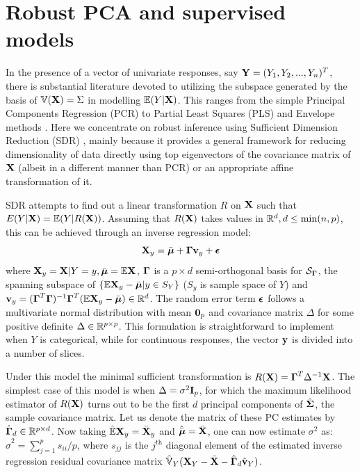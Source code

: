 \section{Robust PCA and supervised models}\label{sec:scatter-sec4-sdr}

In the presence of a vector of univariate responses, say ${\mathbf{Y}} = (Y_1,Y_2,...,Y_n)^T$, there is substantial literature devoted to utilizing the subspace generated by the basis of $ {\mathbb{V}} ({\mathbf{X}}) = \Sigma$ in modelling ${\mathbb{E}}( Y|{\mathbf{X}} )$. This ranges from the simple Principal Components Regression (PCR) to Partial Least Squares (PLS) and Envelope methods \citep{Cook10}. Here we concentrate on robust inference using Sufficient Dimension Reduction (SDR) \citep{AdragniCook09}, mainly because it provides a general framework for reducing dimensionality of data directly using top eigenvectors of the covariance matrix of ${\mathbf{X}}$ (albeit in a different manner than PCR) or an appropriate affine transformation of it.

SDR attempts to find out a linear transformation $R$ on ${\mathbf{X}}$ such that $E(Y|{\mathbf{X}}) = {\mathbb{E}}( Y|R({\mathbf{X}}))$. Assuming that $R({\mathbf{X}})$ takes values in ${\mathbb{R}}^d, d \leq \min(n,p)$, this can be achieved through an inverse regression model:
%
\begin{equation}
{\mathbf{X}}_y = \bar {{\boldsymbol{\mu}}} + {\boldsymbol{\Gamma}} {\bf{v}}_y + {\boldsymbol{\epsilon}}
\end{equation}
%
where ${\mathbf{X}}_y = {\mathbf{X}}|Y=y, \bar{{\boldsymbol{\mu}}} = {\mathbb{E}}{\mathbf{X}}$, ${\boldsymbol{\Gamma}}$ is a $p \times d$ semi-orthogonal basis for $\mathcal S_{\boldsymbol{\Gamma}}$, the spanning subspace of $\{ {\mathbb{E}} {\mathbf{X}}_y - \bar{{\boldsymbol{\mu}}} | y \in S_Y \}$ ($S_y$ is sample space of $Y$) and ${\bf{v}}_y = ({\boldsymbol{\Gamma}}^T {\boldsymbol{\Gamma}})^{-1} {\boldsymbol{\Gamma}}^T ({\mathbb{E}} {\mathbf{X}}_y - \bar{{\boldsymbol{\mu}}}) \in {\mathbb{R}}^d$. The random error term ${\boldsymbol{\epsilon}}$ follows a multivariate normal distribution with mean ${\bf 0}_p$ and covariance matrix $\Delta$ for some positive definite $\Delta \in {\mathbb{R}}^{p \times p}$. This formulation is straightforward to implement when $Y$ is categorical, while for continuous responses, the vector ${\bf{y}}$ is divided into a number of slices.

Under this model the minimal sufficient transformation is $R({\mathbf{X}}) = {\boldsymbol{\Gamma}}^T \Delta^{-1} {\mathbf{X}}$. The simplest case of this model is when $\Delta = \sigma^2 {\mathbf{I}}_p$, for which the maximum likelihood estimator of $ R({\mathbf{X}})$ turns out to be the first $d$ principal components of $\hat {{\boldsymbol{\Sigma}}}$, the sample covariance matrix. Let us denote the matrix of these PC estimates by $\hat {{\boldsymbol{\Gamma}}}_d \in {\mathbb{R}}^{p \times d}$. Now taking $\hat {{\mathbb{E}}}{\mathbf{X}}_y = \bar{{\mathbf{X}}}_y$ and $\hat{\bar{{\boldsymbol{\mu}}}} = \bar{{\mathbf{X}}}$, one can now estimate $\sigma^2$ as: $\hat\sigma^2 = \sum_{j=1}^p s_{ii}/p$, where $s_{jj}$ is the $j^\text{th}$ diagonal element of the estimated inverse regression residual covariance matrix $ \hat {{\mathbb{V}}}_Y( {\mathbf{X}}_Y - \bar{{\mathbf{X}}} - \hat{{\boldsymbol{\Gamma}}}_d \hat{{\bf{v}}}_Y)$.


